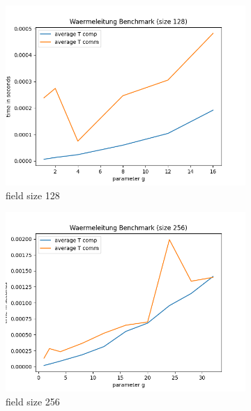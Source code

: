 \documentclass[12pt]{article}
\begin{document}
\begin{figure}[!htb]
    \begin{subfigure}{0.5\textwidth}
        \centering
        \includegraphics[scale=0.5]{../benchmark/plots/plot_avg_128.png}
        \caption{field size 128}\label{fig:plot_128_avg}
    \end{subfigure}
	\begin{subfigure}{0.5\textwidth}
        \centering
        \includegraphics[scale=0.5]{../benchmark/plots/plot_avg_256.png}
        \caption{field size 256}\label{fig:plot_256_avg}
    \end{subfigure}
    \newline
    \begin{subfigure}{0.5\textwidth}

\end{subfigure}
\end{figure}
\end{document}
